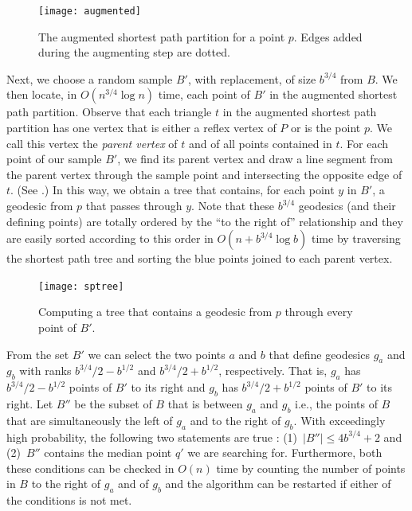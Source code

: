 \documentclass[charterfonts,lotsofwhite]{patmorin}
\begin{document}
\begin{figure}[htbp]
\begin{center}\texttt{[image: augmented]}\end{center}
\caption{The augmented shortest path partition for a point $p$. Edges added
during the augmenting step are dotted.}
\end{figure}

Next, we choose a random sample $B'$, with replacement, of size
$b^{3/4}$ from $B$.  We then locate, in $O(n^{3/4}\log n)$ time, each
point of $B'$ in the augmented shortest path partition. Observe that
each triangle $t$ in the augmented shortest path partition has one
vertex that is either a reflex vertex of $P$ or is the point $p$.  We
call this vertex the \emph{parent vertex} of $t$ and of all points
contained in $t$.  For each point of our sample $B'$, we find its
parent vertex and draw a line segment from the parent vertex through
the sample point and intersecting the opposite edge of $t$.  (See
.) In this way, we obtain a tree that
contains, for each point $y$ in $B'$, a geodesic from $p$ that passes
through $y$.  Note that these $b^{3/4}$ geodesics (and their defining
points) are totally ordered by the ``to the right of'' relationship and
they are easily sorted according to this order in $O(n+b^{3/4}\log b)$
time by traversing the shortest path tree and sorting the blue points
joined to each parent vertex.

\begin{figure}[htbp]
\begin{center}\texttt{[image: sptree]}\end{center}
\caption{Computing a tree that contains a geodesic from $p$ through
every point of $B'$.}
\end{figure}

From the set $B'$ we can select the two points $a$ and $b$ that define
geodesics $g_a$ and $g_b$ with ranks $b^{3/4}/2-b^{1/2}$ and
$b^{3/4}/2+b^{1/2}$, respectively.  That is, $g_a$ has
$b^{3/4}/2-b^{1/2}$ points of $B'$ to its right and $g_b$ has
$b^{3/4}/2+b^{1/2}$ points of $B'$ to its right.  Let $B''$ be the
subset of $B$ that is between $g_a$ and $g_b$ i.e., the points of $B$
that are simultaneously the left of $g_a$ and to the right of $g_b$.
With exceedingly high probability, the following two statements are
true \cite{mr95}:  (1)~$|B''|\le 4b^{3/4}+2$ and (2)~$B''$ contains
the median point $q'$ we are searching for.  Furthermore, both these
conditions can be checked in $O(n)$ time by counting the number of
points in $B$ to the right of $g_a$ and of $g_b$ and the algorithm can
be restarted if either of the conditions is not met.
\end{document}
